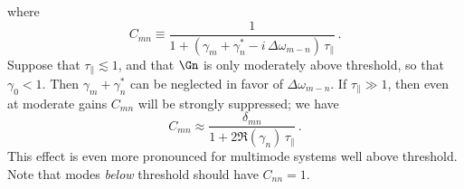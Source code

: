 where
 \begin{equation} \label{eqn:mll_1d_cp_def}
C_{m n} \equiv \frac{1}{1 + \left(\gamma_m + \gamma_n^\ast - i\, \Delta \omega_{m - n}\right)\, \tau_\parallel}\, .
 \end{equation}
Suppose that $\tau_\parallel \lesssim 1$, and that $\Gn$ is only moderately above threshold, so that $\gamma_0 < 1$. Then $\gamma_m + \gamma_n^\ast$ can be neglected in favor of $\Delta \omega_{m - n}$. If $\tau_\parallel \gg 1$, then even at moderate gains $C_{m n}$ will be strongly suppressed; we have
 \begin{equation}
C_{m n} \approx \frac{\delta_{m n}}{1 + 2 \Re (\gamma_n)\, \tau_\parallel}\, .
 \end{equation}
This effect is even more pronounced for multimode systems well above threshold. Note that modes \emph{below} threshold should have $C_{n n} = 1$.

